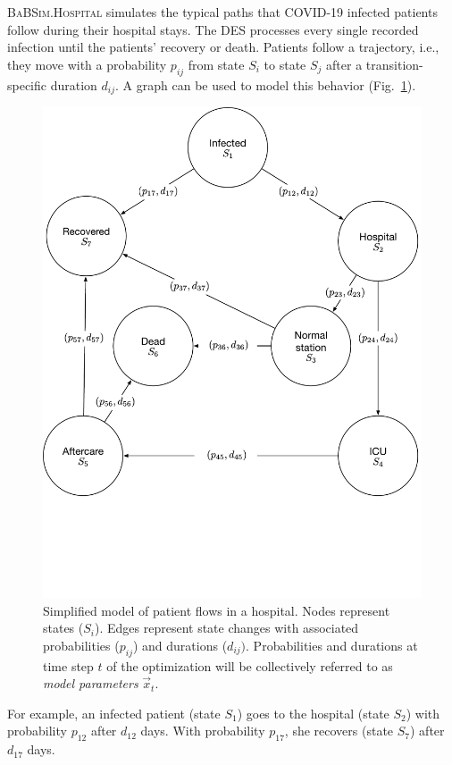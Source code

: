 \documentclass[conference]{IEEEtran}
\def\figref#1{Fig.~\ref{#1}}
\newcommand{\babsimhospital}{\textsc{BaBSim.Hospital}\xspace}
\begin{document}
\babsimhospital simulates the typical paths that COVID-19 infected patients follow during their hospital stays. 
The \gls{DES} processes every single recorded infection until the patients' recovery or death. 
Patients follow a trajectory, i.e., they move with a probability $p_{ij}$ from state $S_i$ to state $S_j$  after a transition-specific duration $d_{ij}$.
A graph can be used to model this behavior (\figref{fig:hospital}).
\begin{figure}
    \centering
    \includegraphics[width=0.95\linewidth]{hospital.pdf}
    \caption{Simplified model of patient flows in a hospital. Nodes represent states ($S_i$). Edges represent state changes with associated probabilities ($p_{ij}$) and durations ($d_{ij})$.
    Probabilities and durations at time step $t$ of the optimization will be collectively referred to as \emph{model parameters} $\vec{x}_t$.}
\label{fig:hospital}
\end{figure}
For example, an infected patient (state $S_1$) goes to the hospital (state $S_2$) with probability $p_{12}$ after $d_{12}$ days. With probability $p_{17}$, she recovers (state $S_7$) after $d_{17}$ days. 
\end{document}
